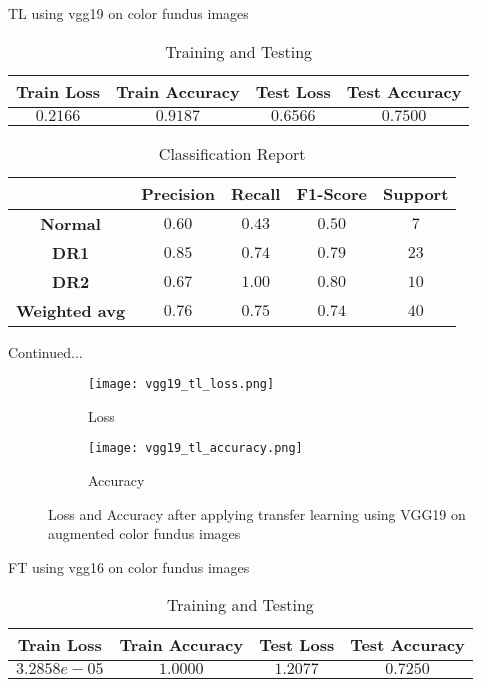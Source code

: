 \documentclass{beamer}
\begin{document}
\begin{frame}{TL using vgg19 on color fundus images}
\begin{table}
\caption{Training and Testing}
\begin{tabular}{c c c c}
\hline
\textbf{Train Loss} & \textbf{Train Accuracy} & \textbf{Test Loss} & \textbf{Test Accuracy}\\
\hline
$0.2166$ & $0.9187$ & $0.6566$ & $0.7500$\\
\hline
\end{tabular}
\end{table}

\begin{table}
\caption{Classification Report}
\begin{tabular}{c c c c c}
\hline
\textbf{} & \textbf{Precision} & \textbf{Recall} & \textbf{F1-Score} & \textbf{Support} \\
\hline
\textbf{Normal} & $0.60$ & $0.43$ & $0.50$ & $7$\\
\textbf{DR1} & $0.85$ & $0.74$ & $0.79$ & $23$\\
\textbf{DR2} & $0.67$ & $1.00$ & $0.80$ & $10$\\
\textbf{Weighted avg} & $0.76$ & $0.75$ & $0.74$ & $40$\\
\hline
\end{tabular}
\end{table}
\end{frame}

\begin{frame}{Continued...}
\begin{figure}[H]
\centering
\begin{subfigure}[h]{0.45\linewidth}
\texttt{[image: vgg19\_tl\_loss.png]}
\caption{Loss}
\label{fig:a}
\end{subfigure}
\quad
\begin{subfigure}[h]{0.45\linewidth}
\texttt{[image: vgg19\_tl\_accuracy.png]}
\caption{Accuracy}
\label{fig:b}
\end{subfigure}
\caption{Loss and Accuracy after applying transfer learning using VGG19 on augmented color fundus images}
\label{fig: Image5}
\end{figure}
\end{frame}

\begin{frame}{FT using vgg16 on color fundus images}
\begin{table}
\caption{Training and Testing}
\begin{tabular}{c c c c}
\hline
\textbf{Train Loss} & \textbf{Train Accuracy} & \textbf{Test Loss} & \textbf{Test Accuracy}\\
\hline
$3.2858e-05$ & $1.0000$ & $1.2077$ & $0.7250$\\
\hline
\end{tabular}
\end{table}
\end{frame}
\end{document}
